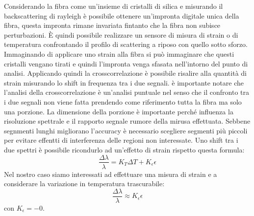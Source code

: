 Considerando la fibra come un'insieme di cristalli di silica e misurando il backscattering di rayleigh è possibile ottenere un'impronta digitale unica della fibra, questa impronta rimane invariata fintanto
che la fibra non subisce perturbazioni. È quindi possibile realizzare un sensore di misura di strain o
di temperatura confrontando il profilo di scattering a riposo con quello sotto sforzo. Immaginando di applicare uno strain alla fibra si può immaginare che questi cristalli vengano tirati e quindi l'impronta venga sfasata nell'intorno del punto di analisi. Applicando quindi la crosscorrelazione è possibile risalire alla quantità di strain misurando lo shift in frequenza tra i due segnali. è importante notare che l'analisi della crosscorrelazione è un'analisi puntuale nel senso che il confronto tra i due segnali non viene fatta prendendo come riferimento tutta la fibra ma solo una porzione. La dimensione della porzione è importante perché influenza la risoluzione spettrale e il rapporto segnale rumore della mirusa effettuata. Sebbene segnmenti lunghi migliorano l'accuracy è necessario scegliere segmenti più piccoli per evitare effentti di interferenza delle regioni non interessate. Uno shift tra i due spettri è possibile ricondurlo ad un'effetto di strain rispetto questa formula:
$$\frac{\Delta\lambda}{\lambda} = K_T\Delta T + K_{\epsilon}\epsilon $$
Nel nostro caso siamo interessati ad effettuare una misura di strain e a considerare la variazione in temperatura trascurabile:
$$\frac{\Delta\lambda}{\lambda} \approx K_{\epsilon}\epsilon $$
con $K_{\epsilon} = -0.$


